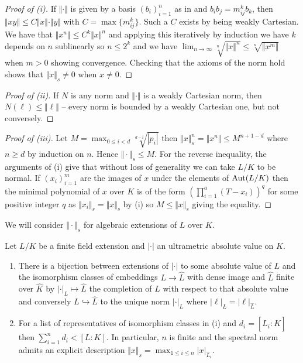 \begin{proof}[Proof of (i)]
    If $\Vert\cdot\Vert$ is given by a basis $(b_{i})_{i=1}^{n}$ as in  and $b_{i}b_{j}=m_{ij}^{k}b_{k}$, then $\Vert xy\Vert\leq C\Vert x\Vert\cdot\Vert y\Vert$ with $C=\max\{m_{ij}^{k}\}$. Such a $C$ exists by being weakly Cartesian. We have that $\Vert x^{n}\Vert\leq C^{k}\Vert x\Vert^{n}$ and applying this iteratively by induction we have $k$ depends on $n$ sublinearly so $n\leq 2^{k}$ and we have $\lim_{n\to\infty}\sqrt[n]{\Vert x\Vert^{n}}\leq\sqrt[n]{\Vert x^{m}\Vert}$ when $m>0$ showing convergence. Checking that the axioms of the norm hold shows that $\Vert x\Vert_{s}\neq0$ when $x\neq0$. 
\end{proof}
\begin{proof}[Proof of (ii)]
    If $N$ is any norm and $\Vert\cdot\Vert$ is a weakly Cartesian norm, then $N(\ell)\leq\Vert \ell\Vert$ -- every norm is bounded by a weakly Cartesian one, but not conversely. 
\end{proof}
\begin{proof}[Proof of (iii)]
    Let $M=\max_{0\leq i<d}\sqrt[d-i]{|p_{i}|}$ then $\Vert x\Vert_{s}^{n}=\Vert x^{n}\Vert\leq M^{n+1-d}$ where $n\geq d$ by induction on $n$. Hence $\Vert\cdot\Vert_{s}\leq M$. For the reverse inequality, the arguments of (i) give that without loss of generality we can take $L/K$ to be normal. If $(x_{i})_{i=1}^{m}$ are the images of $x$ under the elements of $\mathrm{Aut}(L/K)$ then the minimal polynomial of $x$ over $K$ is of the form $\left(\prod_{i=1}^{a}(T-x_{i})\right)^{q}$ for some positive integer $q$ as $\Vert x_{i}\Vert_{s}=\Vert x\Vert_{s}$ by (i) so $M\leq\Vert x\Vert_{s}$ giving the equality. 
\end{proof}
We will consider $\Vert\cdot\Vert_{s}$ for algebraic extensions of $L$ over $K$. 
\begin{proposition}\label{prop: spectral norm for field extensions}
    Let $L/K$ be a finite field extension and $|\cdot|$ an ultrametric absolute value on $K$. 
    \begin{enumerate}[label=(\roman*)]
        \item There is a bijection between extensions of $|\cdot|$ to some absolute value of $L$ and the isomorphism classes of embeddings $L\to\widehat{L}$ with dense image and $\widehat{L}$ finite over $\widehat{K}$ by $|\cdot|_{L}\mapsto\widehat{L}$ the completion of $L$ with respect to that absolute value and conversely $L\hookrightarrow\widehat{L}$ to the unique norm $|\cdot|_{L}$ where $|\ell|_{L}=|\ell|_{\widehat{L}}$. 
        \item For a list of representatives of isomorphism classes in (i) and $d_{i}=[\widehat{L}_{i}:K]$ then $\sum_{i=1}^{n}d_{i}<[L:K]$. In particular, $n$ is finite and the spectral norm admits an explicit description $\Vert x\Vert_{s}=\max_{1\leq i\leq n}|x|_{\widehat{L}_{i}}$. 
    \end{enumerate}
\end{proposition}
